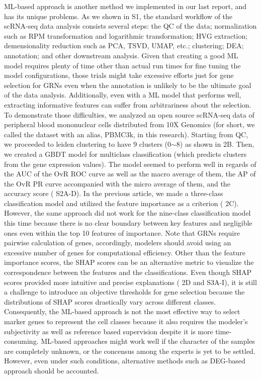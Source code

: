 \documentclass{article}
\begin{document}
ML-based approach is another method we implemented in our last report, and has its unique problems. As we 
shown in \figurename{ S1}, the standard workflow of the scRNA-seq data analysis consists several steps: the \ac{QC} 
of the data; normalization such as \ac{RPM} transformation and logarithmic transformation; 
\ac{HVG} extraction; demensionality reduction such as \ac{PCA}, 
\ac{TSVD}, \ac{UMAP}\cite{umap}, 
etc.; clustering; \ac{DEA}; annotation; and other downstream analysis\cite{luecken2019current}. Given that creating a good ML model 
requires plenty of time other than actual run times for fine tuning the model configurations, those trials might take 
excessive efforts just for gene selection for GRNs even when the annotation is unlikely to be the ultimate goal of 
the data analysis. Additionally, even with a ML model that performs well, extracting informative features can suffer 
from arbitrariness about the selection. To demonstrate those difficulties, we analyzed an open source scRNA-seq 
data of peripheral blood mononuclear cells distributed from 10X Genomics (for short, we called the dataset with 
an alias, PBMC3k, in this research). Starting from QC, we proceeded to leiden clustering to have 9 clusters (0$\sim$8) 
as shown in \figurename{ 2B}. Then, we created a GBDT model for multiclass classification (which predicts clusters from 
the gene expression values). The model seemed to perform well in regards of the \ac{AUC} of 
the \ac{OvR} \ac{ROC} curve as well as the macro average of 
them, the \ac{AP} of the \ac{OvR} \ac{PR} curve accompanied with the micro average of 
them, and the accuracy score (\figurename{ S2A-D}). In the previous article, we made a three-class classification model 
and utilized the feature importance as a criterion (\figurename{ 2C}). However, the same approach did not work for the 
nine-class classification model this time because there is no clear boundary between key features and negligible ones 
even within the top 10 features of importance. Note that GRNs require pairwise calculation of genes, accordingly, 
modelers should avoid using an excessive number of genes for computational efficiency. Other than the feature 
importance scores, the \ac{SHAP} scores can be an alternative metric to visualize the correspondence between the features 
and the classifications\cite{shap}. Even though SHAP scores provided more intuitive and precise explanations (\figurename{ 2D and S3A-I}), 
it is still a challenge to introduce an objective thresholds for gene selection because the distributions 
of SHAP scores drastically vary across different classes. Consequently, the ML-based approach is not the most 
effective way to select marker genes to represent the cell classes because it also requires the modeler's subjectivity as well as reference based supervision 
despite it is more time-consuming. ML-based approaches might work well if the character of the samples are 
completely unknown, or the concensus among the experts is yet to be settled. However, even under such conditions, 
alternative methods such as DEG-based approach should be accounted.
\end{document}
